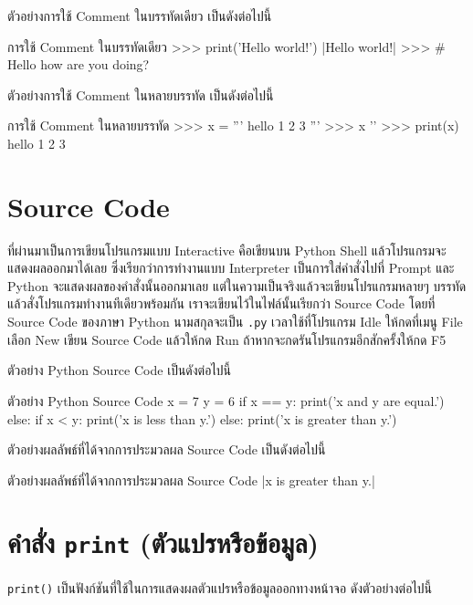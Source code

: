 ตัวอย่างการใช้ Comment ในบรรทัดเดียว เป็นดังต่อไปนี้

\begin{codelist}{การใช้ Comment ในบรรทัดเดียว}{}
>>> print('Hello world!')
|Hello world!|
>>> # Hello how are you doing?
\end{codelist}

ตัวอย่างการใช้ Comment ในหลายบรรทัด เป็นดังต่อไปนี้

\begin{codelist}{การใช้ Comment ในหลายบรรทัด}{}
>>> x = '''
hello
1
2
3
'''
>>> x
'\nhello{}\n'
>>> print(x)
hello
1
2
3
\end{codelist}


\section{Source Code}

ที่ผ่านมาเป็นการเขียนโปรแกรมแบบ Interactive คือเขียนบน Python Shell แล้วโปรแกรมจะแสดงผลออกมาได้เลย ซึ่งเรียกว่าการทำงานแบบ Interpreter เป็นการใส่คำสั่งไปที่ Prompt และ Python จะแสดงผลของคำสั่งนั้นออกมาเลย แต่ในความเป็นจริงแล้วจะเขียนโปรแกรมหลายๆ บรรทัดแล้วสั่งโปรแกรมทำงานทีเดียวพร้อมกัน เราจะเขียนไว้ในไฟล์นั้นเรียกว่า Source Code โดยที่ Source Code ของภาษา Python นามสกุลจะเป็น \texttt{.py} เวลาใช้ที่โปรแกรม Idle ให้กดที่เมนู File เลือก New เขียน Source Code แล้วให้กด Run ถ้าหากจะกดรันโปรแกรมอีกสักครั้งให้กด F5

ตัวอย่าง Python Source Code เป็นดังต่อไปนี้

\begin{codelist}{ตัวอย่าง Python Source Code}{}
x = 7
y = 6
if x == y: print('x and y are equal.')
else:
    if x < y: print('x is less than y.')
    else: print('x is greater than y.')
\end{codelist}

ตัวอย่างผลลัพธ์ที่ได้จากการประมวลผล Source Code เป็นดังต่อไปนี้

\begin{codelist}{ตัวอย่างผลลัพธ์ที่ได้จากการประมวลผล Source Code}{}
|x is greater than y.|
\end{codelist}


\section{คำสั่ง \texttt{print} (ตัวแปรหรือข้อมูล)}

\texttt{print()} เป็นฟังก์ชันที่ใช้ในการแสดงผลตัวแปรหรือข้อมูลออกทางหน้าจอ ดังตัวอย่างต่อไปนี้

